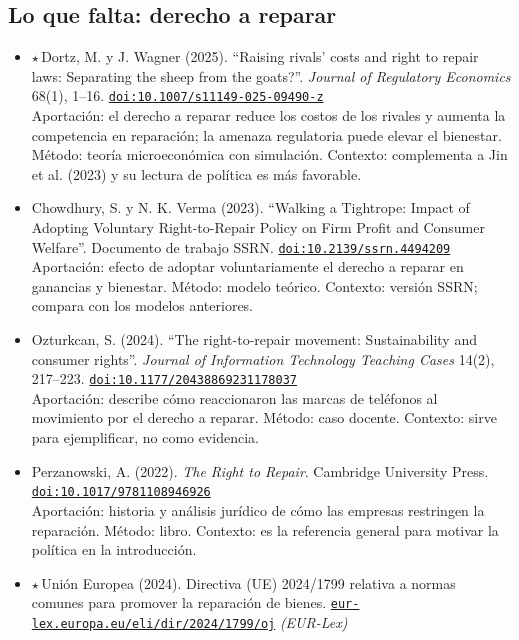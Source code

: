 \documentclass[11pt]{article}
\begin{document}
\subsection*{Lo que falta: derecho a reparar}
\begin{itemize}
\item $\star$\,Dortz, M. y J. Wagner (2025). ``Raising rivals’ costs and right to repair laws: Separating the sheep from the goats?''. \textit{Journal of Regulatory Economics} 68(1), 1--16. \href{https://doi.org/10.1007/s11149-025-09490-z}{\texttt{doi:10.1007/s11149-025-09490-z}}\\
Aportación: el derecho a reparar reduce los costos de los rivales y aumenta la competencia en reparación; la amenaza regulatoria puede elevar el bienestar. Método: teoría microeconómica con simulación. Contexto: complementa a Jin et al. (2023) y su lectura de política es más favorable.
\item Chowdhury, S. y N. K. Verma (2023). ``Walking a Tightrope: Impact of Adopting Voluntary Right-to-Repair Policy on Firm Profit and Consumer Welfare''. Documento de trabajo SSRN. \href{https://doi.org/10.2139/ssrn.4494209}{\texttt{doi:10.2139/ssrn.4494209}}\\
Aportación: efecto de adoptar voluntariamente el derecho a reparar en ganancias y bienestar. Método: modelo teórico. Contexto: versión SSRN; compara con los modelos anteriores.
\item Ozturkcan, S. (2024). ``The right-to-repair movement: Sustainability and consumer rights''. \textit{Journal of Information Technology Teaching Cases} 14(2), 217--223. \href{https://doi.org/10.1177/20438869231178037}{\texttt{doi:10.1177/20438869231178037}}\\
Aportación: describe cómo reaccionaron las marcas de teléfonos al movimiento por el derecho a reparar. Método: caso docente. Contexto: sirve para ejemplificar, no como evidencia.
\item Perzanowski, A. (2022). \textit{The Right to Repair}. Cambridge University Press. \href{https://doi.org/10.1017/9781108946926}{\texttt{doi:10.1017/9781108946926}}\\
Aportación: historia y análisis jurídico de cómo las empresas restringen la reparación. Método: libro. Contexto: es la referencia general para motivar la política en la introducción.
\item $\star$\,Unión Europea (2024). Directiva (UE) 2024/1799 relativa a normas comunes para promover la reparación de bienes. \href{https://eur-lex.europa.eu/eli/dir/2024/1799/oj}{\texttt{eur-lex.europa.eu/eli/dir/2024/1799/oj}} \textit{(EUR-Lex)}\\

\end{itemize}
\end{document}
